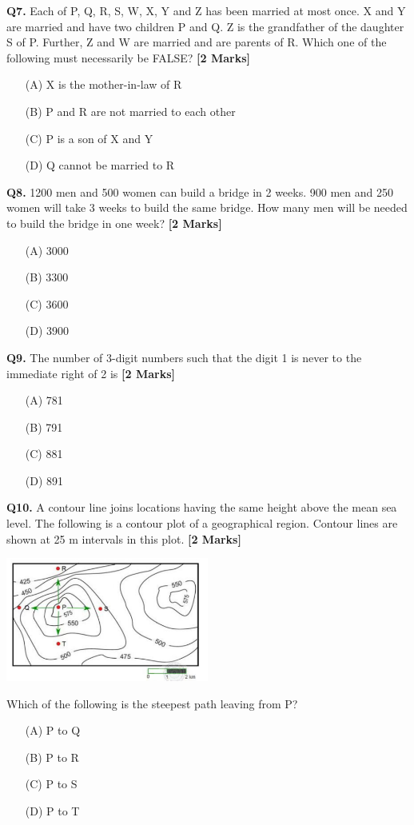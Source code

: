 \documentclass[11pt]{article}
\newcommand{\questionb}[2]{
    \noindent\textbf{Q#2.} #1 \hfill \textbf{[2 Marks]}
}
\begin{document}
\questionb{Each of P, Q, R, S, W, X, Y and Z has been married at most once. X and Y are married and have two children P and Q. Z is the grandfather of the daughter S of P. Further, Z and W are married and are parents of R. Which one of the following must necessarily be FALSE?}{7}
\begin{enumerate}
    \item[(A)] X is the mother-in-law of R  
    \item[(B)] P and R are not married to each other  
    \item[(C)] P is a son of X and Y  
    \item[(D)] Q cannot be married to R  
\end{enumerate}
\vspace{0.5cm}

\questionb{1200 men and 500 women can build a bridge in 2 weeks. 900 men and 250 women will take 3 weeks to build the same bridge. How many men will be needed to build the bridge in one week?}{8}
\begin{enumerate}
    \item[(A)] 3000  
    \item[(B)] 3300  
    \item[(C)] 3600  
    \item[(D)] 3900  
\end{enumerate}
\vspace{0.5cm}

\questionb{The number of 3-digit numbers such that the digit 1 is never to the immediate right of 2 is}{9}
\begin{enumerate}
    \item[(A)] 781  
    \item[(B)] 791  
    \item[(C)] 881  
    \item[(D)] 891  
\end{enumerate}
\vspace{0.5cm}

\questionb{A contour line joins locations having the same height above the mean sea level. The following is a contour plot of a geographical region. Contour lines are shown at 25 m intervals in this plot.}{10}
\begin{center}
\includegraphics[width=0.5\textwidth]{figures/10.png}
\end{center}
Which of the following is the steepest path leaving from P?
\begin{enumerate}
    \item[(A)] P to Q  
    \item[(B)] P to R  
    \item[(C)] P to S  
    \item[(D)] P to T  
\end{enumerate}
\vspace{0.5cm}
\end{document}
